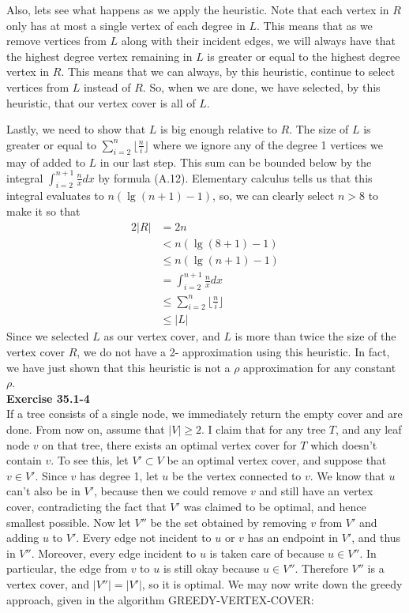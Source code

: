 \documentclass{article}
\begin{document}
Also, lets see what happens as we apply the heuristic. Note that each vertex in $R$ only has at most a single vertex of each degree in $L$. This means that as we remove vertices from $L$ along with their incident edges, we will always have that the highest degree vertex remaining in $L$ is greater or equal to the highest degree vertex in $R$. This means that we can always, by this heuristic, continue to select vertices from $L$ instead of $R$. So, when we are done, we have selected, by this heuristic, that our vertex cover is all of $L$. 

Lastly, we need to show that $L$ is big enough relative to $R$. The size of $L$ is greater or equal to $\sum_{i=2}^n \lfloor\frac{n}{i}\rfloor $ where we ignore any of the degree 1 vertices we may of added to $L$ in our last step. This sum can be bounded below by the integral $\int_{i=2}^{n+1} \frac{n}{x}dx$ by formula (A.12). Elementary calculus tells us that this integral evaluates to $n(\lg(n+1) - 1)$, so, we can clearly select $n>8$ to make it so that 
\begin{align*}
2|R| &= 2n\\
 &< n(\lg(8+1) -1)\\
  &\le n(\lg(n+1) - 1)\\
  &=\int_{i=2}^{n+1} \frac{n}{x}dx\\
  &\le \sum_{i=2}^n \lfloor\frac{n}{i}\rfloor\\
  &\le |L|
  \end{align*}
  Since we selected $L$ as our vertex cover, and $L$ is more than twice the size of the vertex cover $R$, we do not have a 2- approximation using this heuristic. In fact, we have just shown that this heuristic is not a $\rho$ approximation for any constant $\rho$.\\
  
\noindent\textbf{Exercise 35.1-4}\\

If a tree consists of a single node, we immediately return the empty cover and are done.  From now on, assume that $|V| \geq 2$.  I claim that for any tree $T$, and any leaf node $v$ on that tree, there exists an optimal vertex cover for $T$ which doesn't contain $v$. To see this, let $V' \subset V$ be an optimal vertex cover, and suppose that $v \in V'$.  Since $v$ has degree 1, let $u$ be the vertex connected to $v$.  We know that $u$ can't also be in $V'$, because then we could remove $v$ and still have an vertex cover, contradicting the fact that $V'$ was claimed to be optimal, and hence smallest possible.  Now let $V''$ be the set obtained by removing $v$ from $V'$ and adding $u$ to $V'$.  Every edge not incident to $u$ or $v$ has an endpoint in $V'$, and thus in $V''$.  Moreover, every edge incident to $u$ is taken care of because $u \in V''$.  In particular, the edge from $v$ to $u$ is still okay because $u \in V''$.  Therefore $V''$ is a vertex cover, and $|V''| = |V'|$, so it is optimal.  We may now write down the greedy approach, given in the algorithm GREEDY-VERTEX-COVER:\\
\end{document}
